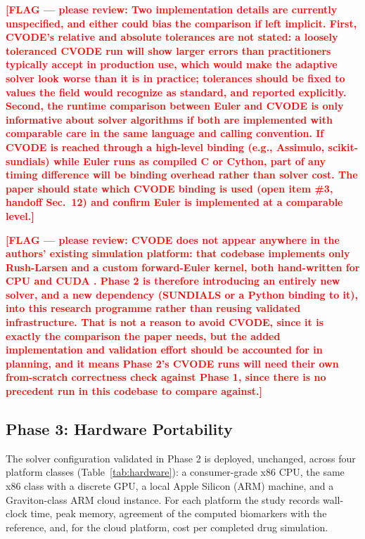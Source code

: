 \documentclass[journal]{IEEEtran}
\newcommand{\flag}[1]{\textcolor{red}{\textbf{[FLAG --- please review: #1]}}}
\begin{document}
\flag{Two implementation details are currently unspecified, and either could bias the comparison if left implicit. First, CVODE's relative and absolute tolerances are not stated: a loosely toleranced CVODE run will show larger errors than practitioners typically accept in production use, which would make the adaptive solver look worse than it is in practice; tolerances should be fixed to values the field would recognize as standard, and reported explicitly. Second, the runtime comparison between Euler and CVODE is only informative about solver algorithms if both are implemented with comparable care in the same language and calling convention. If CVODE is reached through a high-level binding (e.g., Assimulo, scikit-sundials) while Euler runs as compiled C or Cython, part of any timing difference will be binding overhead rather than solver cost. The paper should state which CVODE binding is used (open item \#3, handoff Sec.~12) and confirm Euler is implemented at a comparable level.}

\flag{CVODE does not appear anywhere in the authors' existing simulation platform: that codebase implements only Rush-Larsen and a custom forward-Euler kernel, both hand-written for CPU and CUDA \cite{pramawijaya2024thesis}. Phase 2 is therefore introducing an entirely new solver, and a new dependency (SUNDIALS or a Python binding to it), into this research programme rather than reusing validated infrastructure. That is not a reason to avoid CVODE, since it is exactly the comparison the paper needs, but the added implementation and validation effort should be accounted for in planning, and it means Phase 2's CVODE runs will need their own from-scratch correctness check against Phase 1, since there is no precedent run in this codebase to compare against.}

\subsection{Phase 3: Hardware Portability}

The solver configuration validated in Phase 2 is deployed, unchanged, across four platform classes (Table~\ref{tab:hardware}): a consumer-grade x86 CPU, the same x86 class with a discrete GPU, a local Apple Silicon (ARM) machine, and a Graviton-class ARM cloud instance. For each platform the study records wall-clock time, peak memory, agreement of the computed biomarkers with the reference, and, for the cloud platform, cost per completed drug simulation.
\end{document}
